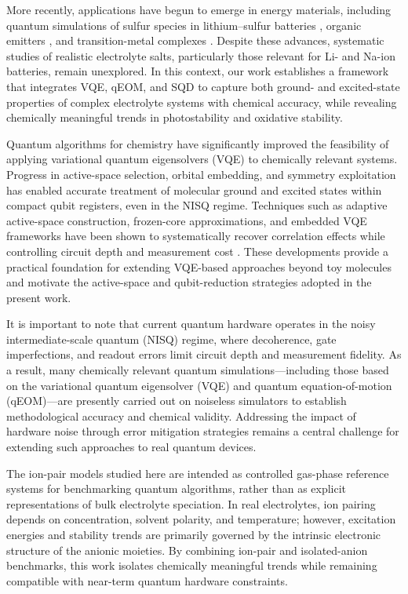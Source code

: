 \documentclass[num-refs]{wiley-article}
\begin{document}
More recently, applications have begun to emerge in energy materials\cite{paudel2022quantum}, including quantum simulations of sulfur species in lithium--sulfur batteries \cite{rice2021quantum}, organic emitters \cite{gao2021applications}, and transition-metal complexes \cite{ghosh2023deep}. Despite these advances, systematic studies of realistic electrolyte salts, particularly those relevant for Li- and Na-ion batteries, remain unexplored. In this context, our work establishes a framework that integrates VQE, qEOM, and SQD to capture both ground- and excited-state properties of complex electrolyte systems with chemical accuracy, while revealing chemically meaningful trends in photostability and oxidative stability.

Quantum algorithms for chemistry have significantly improved the feasibility of applying variational quantum eigensolvers (VQE) to chemically relevant systems. Progress in active-space selection, orbital embedding, and symmetry exploitation has enabled accurate treatment of molecular ground and excited states within compact qubit registers, even in the NISQ regime. Techniques such as adaptive active-space construction, frozen-core approximations, and embedded VQE frameworks have been shown to systematically recover correlation effects while controlling circuit depth and measurement cost \cite{alfonso2025chemical,lim2024fragment}. These developments provide a practical foundation for extending VQE-based approaches beyond toy molecules and motivate the active-space and qubit-reduction strategies adopted in the present work.

It is important to note that current quantum hardware operates in the noisy intermediate-scale quantum (NISQ) regime, where decoherence, gate imperfections, and readout errors limit circuit depth and measurement fidelity. As a result, many chemically relevant quantum simulations—including those based on the variational quantum eigensolver (VQE) and quantum equation-of-motion (qEOM)—are presently carried out on noiseless simulators to establish methodological accuracy and chemical validity. Addressing the impact of hardware noise through error mitigation strategies remains a central challenge for extending such approaches to real quantum devices.

The ion-pair models studied here are intended as controlled gas-phase reference systems for benchmarking quantum algorithms, rather than as explicit representations of bulk electrolyte speciation. In real electrolytes, ion pairing depends on concentration, solvent polarity, and temperature; however, excitation energies and stability trends are primarily governed by the intrinsic electronic structure of the anionic moieties. By combining ion-pair and isolated-anion benchmarks, this work isolates chemically meaningful trends while remaining compatible with near-term quantum hardware constraints.
\end{document}
